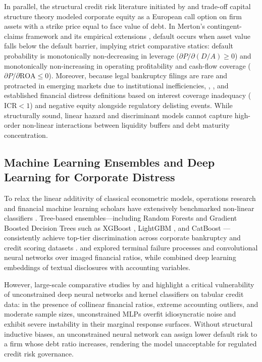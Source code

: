 \documentclass[pdflatex,sn-mathphys-num,twocolumn]{sn-jnl}
\theoremstyle{thmstyleone}
\theoremstyle{thmstyletwo}
\theoremstyle{thmstylethree}
\begin{document}
In parallel, the structural credit risk literature initiated by \citet{merton1974pricing} and trade-off capital structure theory \citep{kraus1973state,myers1984capital} modeled corporate equity as a European call option on firm assets with a strike price equal to face value of debt. In Merton's contingent-claims framework and its empirical extensions \citep{hillegeist2004assessing,duffie2007multi,bharath2008forecasting}, default occurs when asset value falls below the default barrier, implying strict comparative statics: default probability is monotonically non-decreasing in leverage ($\partial P / \partial (D/A) \ge 0$) and monotonically non-increasing in operating profitability and cash-flow coverage ($\partial P / \partial \text{ROA} \le 0$). Moreover, because legal bankruptcy filings are rare and protracted in emerging markets due to institutional inefficiencies, \citet{asquith1994anatomy}, \citet{pindado2008estimating}, and \citet{tinoco2013financial} established financial distress definitions based on interest coverage inadequacy ($\text{ICR} < 1$) and negative equity alongside regulatory delisting events. While structurally sound, linear hazard and discriminant models cannot capture high-order non-linear interactions between liquidity buffers and debt maturity concentration.

\subsection{Machine Learning Ensembles and Deep Learning for Corporate Distress}
To relax the linear additivity of classical econometric models, operations research and financial machine learning scholars have extensively benchmarked non-linear classifiers \citep{kumar2007bankruptcy,lessmann2015benchmarking,jones2017predicting}. Tree-based ensembles---including Random Forests \citep{breiman2001random} and Gradient Boosted Decision Trees such as XGBoost \citep{chen2016xgboost}, LightGBM \citep{ke2017lightgbm}, and CatBoost \citep{prokhorenkova2018catboost}---consistently achieve top-tier discrimination across corporate bankruptcy and credit scoring datasets \citep{geng2015prediction,zieba2016ensemble,barboza2017machine,veganzones2018investigation,gunnarsson2021deep}. \citet{dujardin2015bankruptcy} and \citet{hosaka2019bankruptcy} explored terminal failure processes and convolutional neural networks over imaged financial ratios, while \citet{mai2019deep} combined deep learning embeddings of textual disclosures with accounting variables.

However, large-scale comparative studies by \citet{gunnarsson2021deep} and \citet{dumitrescu2022machine} highlight a critical vulnerability of unconstrained deep neural networks and kernel classifiers on tabular credit data: in the presence of collinear financial ratios, extreme accounting outliers, and moderate sample sizes, unconstrained MLPs overfit idiosyncratic noise and exhibit severe instability in their marginal response surfaces. Without structural inductive biases, an unconstrained neural network can assign lower default risk to a firm whose debt ratio increases, rendering the model unacceptable for regulated credit risk governance.
\end{document}
